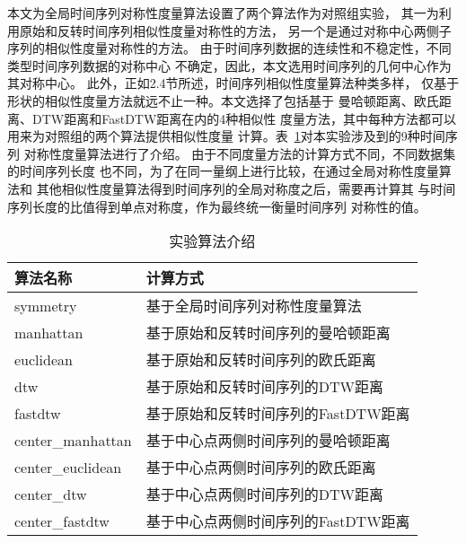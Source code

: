 本文为全局时间序列对称性度量算法设置了两个算法作为对照组实验，
其一为利用原始和反转时间序列相似性度量对称性的方法，
另一个是通过对称中心两侧子序列的相似性度量对称性的方法。
由于时间序列数据的连续性和不稳定性，不同类型时间序列数据的对称中心
不确定，因此，本文选用时间序列的几何中心作为其对称中心。
此外，正如2.4节所述，时间序列相似性度量算法种类多样，
仅基于形状的相似性度量方法就远不止一种。本文选择了包括基于
曼哈顿距离、欧氏距离、DTW距离和FastDTW距离在内的4种相似性
度量方法，其中每种方法都可以用来为对照组的两个算法提供相似性度量
计算。表~\ref{tab:experiment_algorithm}对本实验涉及到的9种时间序列
对称性度量算法进行了介绍。
由于不同度量方法的计算方式不同，不同数据集的时间序列长度
也不同，为了在同一量纲上进行比较，在通过全局对称性度量算法和
其他相似性度量算法得到时间序列的全局对称度之后，需要再计算其
与时间序列长度的比值得到单点对称度，作为最终统一衡量时间序列
对称性的值。
\begin{table}
  \centering
  \caption{实验算法介绍}
  \begin{tabular}{ll}
    \toprule
    算法名称          & 计算方式                            \\
    \midrule
    symmetry          & 基于全局时间序列对称性度量算法      \\
    manhattan         & 基于原始和反转时间序列的曼哈顿距离  \\
    euclidean         & 基于原始和反转时间序列的欧氏距离    \\
    dtw               & 基于原始和反转时间序列的DTW距离     \\
    fastdtw           & 基于原始和反转时间序列的FastDTW距离 \\
    center\_manhattan & 基于中心点两侧时间序列的曼哈顿距离  \\
    center\_euclidean & 基于中心点两侧时间序列的欧氏距离    \\
    center\_dtw       & 基于中心点两侧时间序列的DTW距离     \\
    center\_fastdtw   & 基于中心点两侧时间序列的FastDTW距离 \\
    \bottomrule
  \end{tabular}
  \label{tab:experiment_algorithm}
\end{table}


